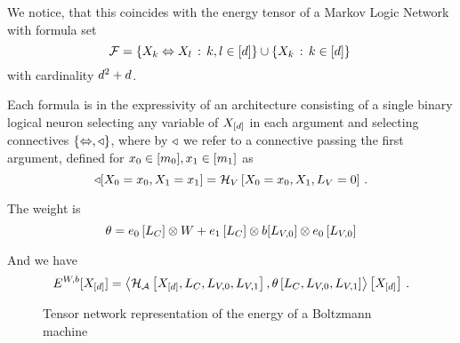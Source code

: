 We notice, that this coincides with the energy tensor of a Markov Logic Network with formula set 
	\[ \mathcal{F} = \{ X_{k} \Leftrightarrow X_{l} \, : \, k,l \in[d] \} 
	\cup \{ X_{k}\, : \, k\in[d] \} \, \]
with cardinality $d^2+d$.

Each formula is in the expressivity of an architecture consisting of a single binary logical neuron selecting any variable of $X_{[d]}$ in each argument and selecting connectives $\{\Leftrightarrow,\triangleleft\}$, where by $\triangleleft$ we refer to a connective passing the first argument, defined for $x_{0}\in[m_{0}], x_{1}\in[m_{1}]$ as 
	\[ \triangleleft[X_{0}=x_{0},X_{1}=x_{1}] = \mathcal{H}_{V}\left[X_{0}=x_{0},X_{1},L_{V}=0\right] \, . \]

The weight is
	\[ \theta 
	= e_{0}\left[L_{C}\right] \otimes W 
	+ e_{1}\left[L_{C}\right] \otimes b[L_{V,0}] \otimes  e_{0}\left[L_{V,0}\right] 
	\]
	
And we have
	\[ E^{W,b}[X_{[d]}] = 
	\left\langle \mathcal{H}_{\mathcal{A}}\left[X_{[d]},L_{C},L_{V,0},L_{V,1}\right], \theta\left[L_{C},L_{V,0},L_{V,1}\right]\right\rangle \left[ X_{[d]} \right] \, . \]


\begin{figure}[h]
\begin{center}
	
\end{center}
\caption{Tensor network representation of the energy of a Boltzmann machine}
\label{fig:boltzmannEnergy}
\end{figure}





